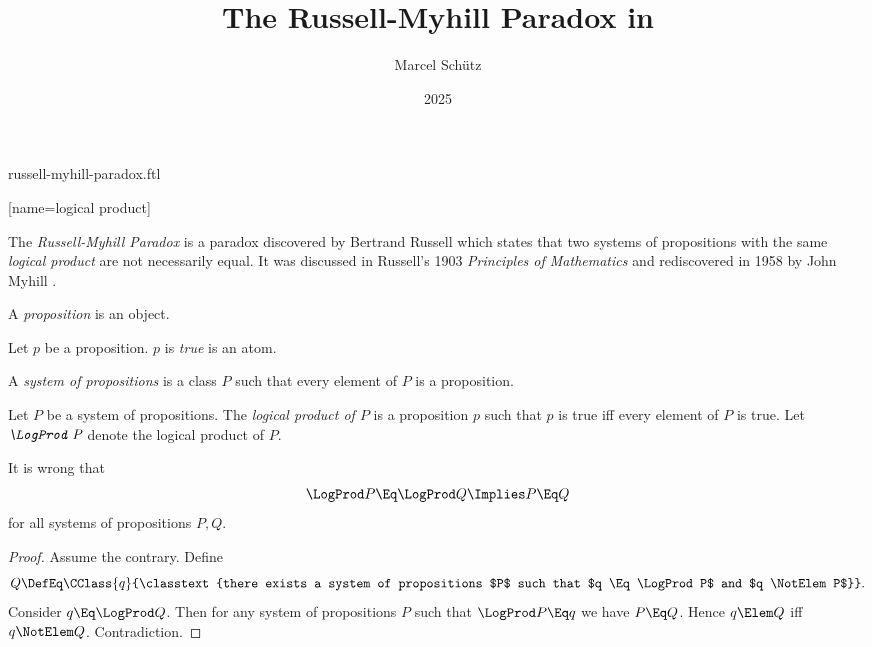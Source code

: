\documentclass{stex}
\title{The Russell-Myhill Paradox in \Naproche}
\author{Marcel Schütz}
\date{2025}
\begin{document}
\begin{smodule}{russell-myhill-paradox.ftl}


[name=logical product]{\sqcap\,}

\maketitle

\noindent The \emph{Russell-Myhill Paradox} is a paradox discovered by 
Bertrand Russell which states that two systems of propositions with the same 
\emph{logical product} are not necessarily equal.
It was discussed in Russell's 1903 \emph{Principles of Mathematics}
\cite[Appendix B]{Russell1903} and rediscovered in 1958 by John Myhill
\cite{Myhill1958}.

\begin{forthel}
  \begin{signature*}[for=proposition]
    A \emph{proposition} is an object.
  \end{signature*}

  \begin{signature*}[for=true]
    Let $p$ be a proposition.
    $p$ is \emph{true} is an atom.
  \end{signature*}

  \begin{definition*}[for=system of propositions]
    A \emph{system of propositions} is a class $P$ such that every element of $P$ is a proposition.
  \end{definition*}

  \begin{signature*}[for=logical product]
    Let $P$ be a system of propositions.
    The \emph{logical product of $P$} is a proposition $p$ such that $p$ is true iff every element of $P$ is true.
    Let $\emph{\LogProd P}$ denote the logical product of $P$.
  \end{signature*}
  
  \begin{theorem*}[title=Russell-Myhill Paradox,name=Russell-Myhill Paradox]
    It is wrong that
    \[ \LogProd P \Eq \LogProd Q \Implies P \Eq Q \]
    for all systems of propositions $P, Q$.
  \end{theorem*}
  \begin{proof}
    Assume the contrary.
    Define
    \[ Q \DefEq \CClass{q}{\classtext{there exists a system of propositions $P$ such
    that $q \Eq \LogProd P$  and $q \NotElem P$}}. \]
    Consider $q \Eq \LogProd Q$.
    Then for any system of propositions $P$ such that $\LogProd P \Eq q$ we have $P \Eq Q$.
    Hence $q \Elem Q$ iff $q \NotElem Q$.
    Contradiction.
  \end{proof}
\end{forthel}

\printbibliography
{}
\end{smodule}
\end{document}
